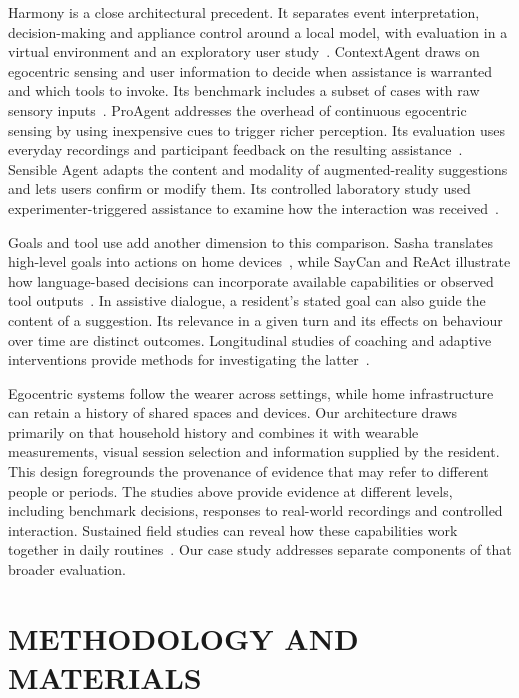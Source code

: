 \documentclass[a4paper,twoside]{article}
\begin{document}
Harmony is a close architectural precedent. It separates event interpretation, decision-making and appliance control around a local model, with evaluation in a virtual environment and an exploratory user study~\cite{yin2025harmony}. ContextAgent draws on egocentric sensing and user information to decide when assistance is warranted and which tools to invoke. Its benchmark includes a subset of cases with raw sensory inputs~\cite{yang2025contextagent}. ProAgent addresses the overhead of continuous egocentric sensing by using inexpensive cues to trigger richer perception. Its evaluation uses everyday recordings and participant feedback on the resulting assistance~\cite{yang2026proagent}. Sensible Agent adapts the content and modality of augmented-reality suggestions and lets users confirm or modify them. Its controlled laboratory study used experimenter-triggered assistance to examine how the interaction was received~\cite{lee2025sensible}.

Goals and tool use add another dimension to this comparison. Sasha translates high-level goals into actions on home devices~\cite{king2024sasha}, while SayCan and ReAct illustrate how language-based decisions can incorporate available capabilities or observed tool outputs~\cite{ahn2022saycan,yao2023react}. In assistive dialogue, a resident's stated goal can also guide the content of a suggestion. Its relevance in a given turn and its effects on behaviour over time are distinct outcomes. Longitudinal studies of coaching and adaptive interventions provide methods for investigating the latter~\cite{bickmore2013interventions,nahumshani2018jitai}.

Egocentric systems follow the wearer across settings, while home infrastructure can retain a history of shared spaces and devices. Our architecture draws primarily on that household history and combines it with wearable measurements, visual session selection and information supplied by the resident. This design foregrounds the provenance of evidence that may refer to different people or periods. The studies above provide evidence at different levels, including benchmark decisions, responses to real-world recordings and controlled interaction. Sustained field studies can reveal how these capabilities work together in daily routines~\cite{brown2011wild}. Our case study addresses separate components of that broader evaluation.

\section{\uppercase{Methodology and Materials}}
\label{sec:methodology}
\end{document}
